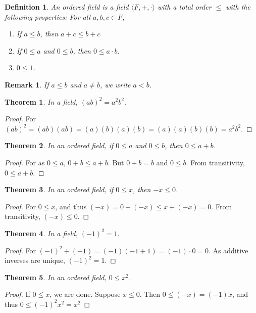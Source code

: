\documentclass[oneside]{book}
\theoremstyle{mystyle}
\newtheorem{theorem}{Theorem}[section]
\newtheorem{definition}{Definition}[section]
\newtheorem{remark}{Remark}[section]
\begin{document}
\begin{definition}
An ordered field is a field $\langle F,+,\cdot \rangle$ with a total order $\leq$ with the following properties: For all $a,b,c\in F$,
\begin{enumerate}
\item If $a\leq b$, then $a+c\leq b+c$
\item If $0 \leq a$ and $0\leq b$, then $0\leq a\cdot b$.
\item $0\leq 1$.
\end{enumerate}
\end{definition}

\begin{remark}
If $a\leq b$ and $a\ne b$, we write $a<b$.
\end{remark}

\begin{theorem}
In a field, $(ab)^2 = a^2b^2$.
\end{theorem}
\begin{proof}
For $(ab)^2 = (ab)(ab)=(a)(b)(a)(b)= (a)(a)(b)(b)=a^2b^2$.
\end{proof}

\begin{theorem} In an ordered field, if $0\leq a$ and $0\leq b$, then $0\leq a+b$.
\end{theorem}
\begin{proof}
For as $0\leq a$, $0+b\leq a+b$. But $0+b = b$ and $0\leq b$. From transitivity, $0\leq a+b$.
\end{proof}

\begin{theorem}
In an ordered field, if $0\leq x$, then $-x\leq 0$.
\end{theorem}
\begin{proof}
For $0\leq x$, and thus $(-x)=0+(-x)\leq x+(-x) =0$. From transitivity, $(-x)\leq 0$.
\end{proof}

\begin{theorem}
In a field, $(-1)^2 = 1$.
\end{theorem}
\begin{proof}
For $(-1)^2 +(-1) = (-1)(-1+1) = (-1)\cdot 0 = 0$. As additive inverses are unique, $(-1)^2 = 1$.
\end{proof}

\begin{theorem}
In an ordered field, $0\leq x^2$.
\end{theorem}
\begin{proof}
If $0 \leq x$, we are done. Suppose $x\leq 0$. Then $0\leq (-x) = (-1)x$, and thus $0\leq (-1)^2 x^2=x^2$
\end{proof}
\end{document}
